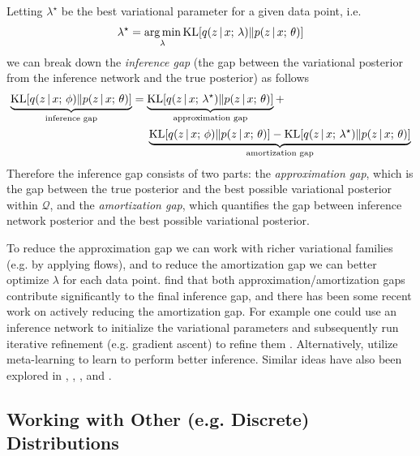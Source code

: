 \documentclass{article}
\begin{document}
Letting $\lambda^\star$ be the best variational parameter for a given data point, i.e.
\[ \lambda^\star = \argmin_\lambda \KL[q(z \given x \param \lambda) \Vert p(z \given x \param \theta)] \]
we can break down the \emph{inference gap} (the gap between the variational posterior from the inference network and the true posterior) as follows \citep{Cremer2018}
\begin{align*}
    \underbrace{\operatorname*{KL}[q(z \,|\, x ; \, \phi) \Vert p(z \,|\, x ; \, \theta)]}_{\text{inference gap}}  &= \underbrace{\operatorname*{KL}[q(z \,|\, x ; \, \lambda^\star) \Vert p(z \,|\, x ; \, \theta)]}_{\text{approximation gap}} + \\ &\,\,\,\,\,\,\,\, \underbrace{\operatorname*{KL}[q(z \,|\, x ; \, \phi) \Vert p(z \,|\, x ; \, \theta)] - \operatorname*{KL}[q(z \,|\, x ; \, \lambda^\star) \Vert p(z \,|\, x ; \, \theta)]}_{\text{amortization gap}}
\end{align*} 
Therefore the inference gap consists of two parts: the \emph{approximation gap}, which is the  gap between the true posterior and the best possible variational posterior within $\mathcal{Q}$, and the \emph{amortization gap}, which quantifies the gap between inference network posterior and the best possible variational posterior.

To reduce the approximation gap we can work with richer variational families (e.g. by applying flows),
and to reduce the amortization gap we can better optimize $\lambda$ for each data point. \cite{Cremer2018}
find that both approximation/amortization gaps contribute significantly to the final inference gap,
and there has been some recent work on actively reducing the amortization gap.
For example one could use an inference network to initialize the variational parameters and subsequently run iterative refinement (e.g. gradient ascent) to refine them \citep{Hjelm2016,Krishnan2017,Kim2018}. Alternatively, \cite{Marino2017} utilize meta-learning \citep{Andrychowicz2016} to learn to perform better
inference. Similar ideas have also been explored in \cite{Salakhutdinov2010}, \cite{Cho2013}, \cite{Salimans2015}, and \cite{Pu2017}.

\subsection{Working with Other (e.g. Discrete) Distributions}\label{otherdist}
\end{document}
